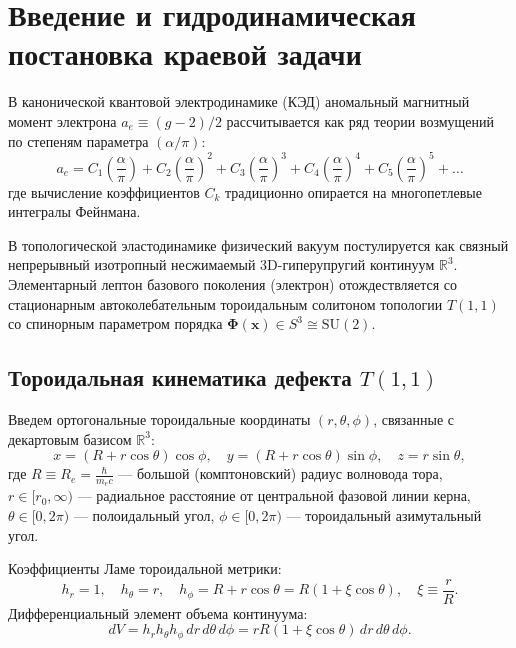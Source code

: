 \documentclass[12pt,a4paper]{article}
\begin{document}
	\section{Введение и гидродинамическая постановка краевой задачи}
	
	В канонической квантовой электродинамике (КЭД) аномальный магнитный момент электрона $a_e \equiv (g-2)/2$ рассчитывается как ряд теории возмущений по степеням параметра $(\alpha/\pi)$:
	\begin{equation}
		a_e = C_1 \left(\frac{\alpha}{\pi}\right) + C_2 \left(\frac{\alpha}{\pi}\right)^2 + C_3 \left(\frac{\alpha}{\pi}\right)^3 + C_4 \left(\frac{\alpha}{\pi}\right)^4 + C_5 \left(\frac{\alpha}{\pi}\right)^5 + \dots
	\end{equation}
	где вычисление коэффициентов $C_k$ традиционно опирается на многопетлевые интегралы Фейнмана.
	
	В топологической эластодинамике физический вакуум постулируется как связный непрерывный изотропный несжимаемый 3D-гиперупругий континуум $\mathbb{R}^3$. Элементарный лептон базового поколения (электрон) отождествляется со стационарным автоколебательным тороидальным солитоном топологии $T(1,1)$ со спинорным параметром порядка $\boldsymbol{\Phi}(\mathbf{x}) \in S^3 \cong \mathrm{SU}(2)$.
	
	\subsection{Тороидальная кинематика дефекта $T(1,1)$}
	Введем ортогональные тороидальные координаты $(r, \theta, \phi)$, связанные с декартовым базисом $\mathbb{R}^3$:
	\begin{equation}
		x = (R + r \cos\theta) \cos\phi, \quad y = (R + r \cos\theta) \sin\phi, \quad z = r \sin\theta,
	\end{equation}
	где $R \equiv R_e = \frac{\hbar}{m_e c}$ --- большой (комптоновский) радиус волновода тора, $r \in [r_0, \infty)$ --- радиальное расстояние от центральной фазовой линии керна, $\theta \in [0, 2\pi)$ --- полоидальный угол, $\phi \in [0, 2\pi)$ --- тороидальный азимутальный угол.
	
	Коэффициенты Ламе тороидальной метрики:
	\begin{equation}
		h_r = 1, \quad h_\theta = r, \quad h_\phi = R + r \cos\theta = R(1 + \xi \cos\theta), \quad \xi \equiv \frac{r}{R}.
	\end{equation}
	Дифференциальный элемент объема континуума:
	\begin{equation}
		dV = h_r h_\theta h_\phi \, dr \, d\theta \, d\phi = r R (1 + \xi \cos\theta) \, dr \, d\theta \, d\phi.
	\end{equation}
	
\end{document}

